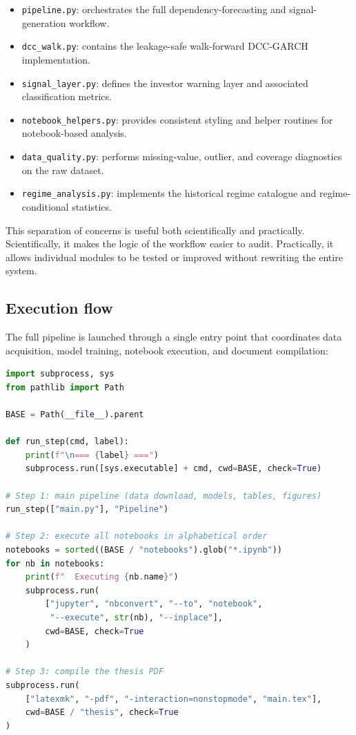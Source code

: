 \begin{itemize}
    \item \texttt{pipeline.py}: orchestrates the full dependency-forecasting and signal-generation workflow.
    \item \texttt{dcc\_walk.py}: contains the leakage-safe walk-forward DCC-GARCH implementation.
    \item \texttt{signal\_layer.py}: defines the investor warning layer and associated classification metrics.
    \item \texttt{notebook\_helpers.py}: provides consistent styling and helper routines for notebook-based analysis.
    \item \texttt{data\_quality.py}: performs missing-value, outlier, and coverage diagnostics on the raw dataset.
    \item \texttt{regime\_analysis.py}: implements the historical regime catalogue and regime-conditional statistics.
\end{itemize}

This separation of concerns is useful both scientifically and practically. Scientifically, it makes the logic of the workflow easier to audit. Practically, it allows individual modules to be tested or improved without rewriting the entire system.

\subsection{Execution flow}

The full pipeline is launched through a single entry point that coordinates data acquisition, model training, notebook execution, and document compilation:

\begin{lstlisting}[language=Python, caption={Automated full-pipeline runner (\texttt{run\_all.py}).}, label=lst:runall]
import subprocess, sys
from pathlib import Path

BASE = Path(__file__).parent

def run_step(cmd, label):
    print(f"\n=== {label} ===")
    subprocess.run([sys.executable] + cmd, cwd=BASE, check=True)

# Step 1: main pipeline (data download, models, tables, figures)
run_step(["main.py"], "Pipeline")

# Step 2: execute all notebooks in alphabetical order
notebooks = sorted((BASE / "notebooks").glob("*.ipynb"))
for nb in notebooks:
    print(f"  Executing {nb.name}")
    subprocess.run(
        ["jupyter", "nbconvert", "--to", "notebook",
         "--execute", str(nb), "--inplace"],
        cwd=BASE, check=True
    )

# Step 3: compile the thesis PDF
subprocess.run(
    ["latexmk", "-pdf", "-interaction=nonstopmode", "main.tex"],
    cwd=BASE / "thesis", check=True
)
\end{lstlisting}

